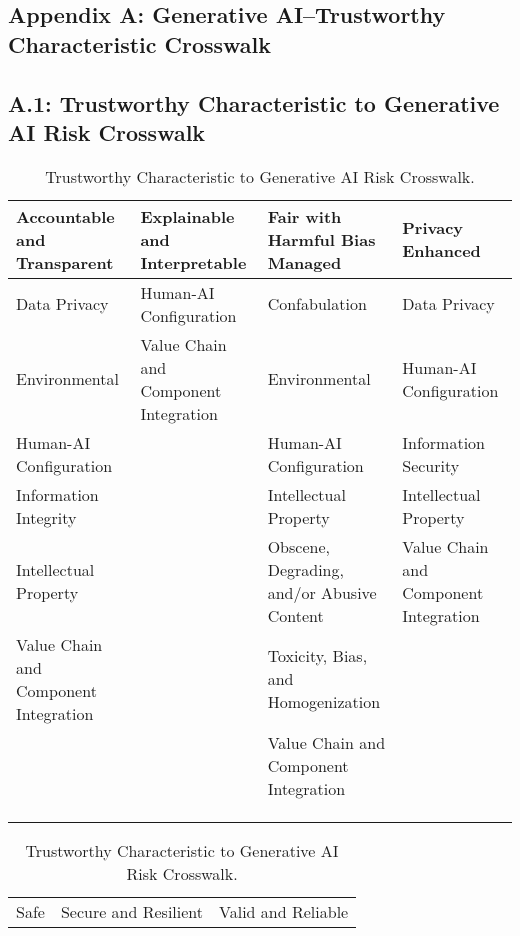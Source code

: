 \documentclass[fleqn]{article}
\begin{document}
\begin{landscape}
\thispagestyle{empty}	
\section*{Appendix A: Generative AI--Trustworthy Characteristic Crosswalk}\label{sec:appndxa}

\subsection{A.1: Trustworthy Characteristic to Generative AI Risk Crosswalk}\label{sec:appndxa1}

\begin{table}[H]
	\caption{Trustworthy Characteristic to Generative AI Risk Crosswalk.}
	\label{tab:tc_to_gai_risk_cw}
	\footnotesize
	\begin{tabular}{llll}
		\toprule
		Accountable and Transparent & Explainable and Interpretable & Fair with Harmful Bias Managed & Privacy Enhanced \\
		\midrule
		Data Privacy & Human-AI Configuration & Confabulation & Data Privacy \\
		Environmental & Value Chain and Component Integration & Environmental & Human-AI Configuration \\
		Human-AI Configuration &  & Human-AI Configuration & Information Security \\
		Information Integrity &  & Intellectual Property & Intellectual Property \\
		Intellectual Property &  & Obscene, Degrading, and/or Abusive Content & Value Chain and Component Integration \\
		Value Chain and Component Integration &  & Toxicity, Bias, and Homogenization &  \\
 		&  & Value Chain and Component Integration &  \\
 		&  &  &  \\
 		&  &  &  \\
 		&  &  &  \\
		\bottomrule
	\end{tabular}
	\newline
	\vspace{10pt}
	\newline
	\begin{tabular}{lll}
		\toprule
		Safe & Secure and Resilient & Valid and Reliable \\

\end{tabular}
\end{table}
\end{landscape}
\end{document}
